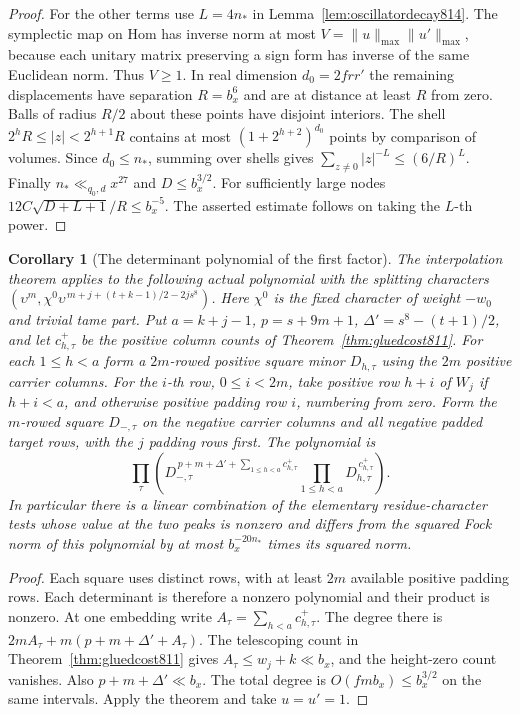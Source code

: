 \documentclass[a4paper,11pt]{article}
\newtheorem{corollary}[proposition]{Corollary}
\theoremstyle{definition}
\theoremstyle{remark}
\numberwithin{equation}{section}
\begin{document}
\begin{proof}
For the other terms use \(L=4n_*\) in
Lemma~\ref{lem:oscillatordecay814}. The symplectic map
on Hom has inverse norm at most
\(V=\|u\|_{\max}\|u'\|_{\max}\), because each unitary
matrix preserving a sign form has inverse of the same
Euclidean norm. Thus \(V\ge1\). In real dimension
\(d_0=2frr'\) the remaining displacements have separation
\(R=b_x^6\) and are at distance at least \(R\) from zero.
Balls of radius \(R/2\) about these points have disjoint
interiors. The shell \(2^h R\le |z|<2^{h+1}R\) contains
at most \((1+2^{h+2})^{d_0}\) points by comparison of
volumes. Since \(d_0\le n_*\), summing over shells gives
\(\sum_{z\ne0}|z|^{-L}\le(6/R)^L\).
Finally \(n_*\ll_{q_0,d}x^{27}\) and
\(D\le b_x^{3/2}\). For sufficiently large nodes
\(12C\sqrt{D+L+1}/R\le b_x^{-5}\).
The asserted estimate follows on taking the \(L\)-th power.
\end{proof}

\begin{corollary}[The determinant polynomial of the first factor]
\leavevmode\label{cor:paddedminor814}
The interpolation theorem applies to the following actual
polynomial with the splitting characters
\((\upsilon^m,\chi^0\upsilon^{\,m+j+(t+k-1)/2-2js^8})\).
Here \(\chi^0\) is the fixed character of weight \(-w_0\)
and trivial tame part. Put \(a=k+j-1\), \(p=s+9m+1\),
\(\Delta'=s^8-(t+1)/2\), and let \(c^+_{h,\tau}\) be the
positive column counts of Theorem~\ref{thm:gluedcost811}.
For each \(1\le h<a\) form a \(2m\)-rowed positive square
minor \(D_{h,\tau}\) using the \(2m\) positive carrier
columns. For the \(i\)-th row, \(0\le i<2m\), take positive
row \(h+i\) of \(W_j\) if \(h+i<a\), and otherwise positive
padding row \(i\), numbering from zero. Form the \(m\)-rowed
square \(D_{-,\tau}\) on the negative carrier columns and
all negative padded target rows, with the \(j\) padding
rows first. The polynomial is
\[
 \prod_\tau\left(D_{-,\tau}^{\,p+m+\Delta'+\sum_{1\le h<a}c^+_{h,\tau}}
              \prod_{1\le h<a}D_{h,\tau}^{\,c^+_{h,\tau}}\right).
\]
In particular there is a linear combination of the elementary
residue-character tests whose value at the two peaks is
nonzero and differs from the squared Fock norm of this
polynomial by at most \(b_x^{-20n_*}\) times its squared norm.
\end{corollary}
\begin{proof}
Each square uses distinct rows, with at least \(2m\)
available positive padding rows. Each determinant is
therefore a nonzero polynomial and their product is nonzero.
At one embedding write \(A_\tau=\sum_{h<a}c^+_{h,\tau}\).
The degree there is \(2m A_\tau+m(p+m+\Delta'+A_\tau)\).
The telescoping count in Theorem~\ref{thm:gluedcost811}
gives \(A_\tau\le w_j+k\ll b_x\), and the height-zero count
vanishes. Also \(p+m+\Delta'\ll b_x\). The total degree
is \(O(fm b_x)\le b_x^{3/2}\) on the same intervals.
Apply the theorem and take \(u=u'=1\).
\end{proof}
\end{document}
